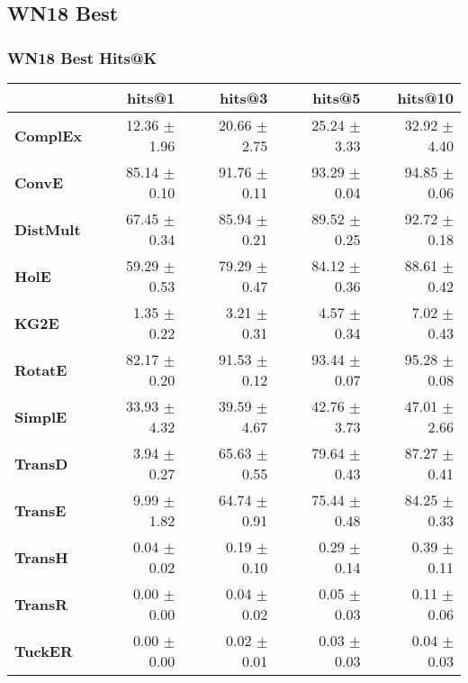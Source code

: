 \documentclass{article}
\begin{document}
\subsection{WN18 Best}
\subsubsection{WN18 Best Hits@K}
    \begin{center}
    \begin{tabular}{lrrrr}
\toprule
{} &        hits@1 &        hits@3 &        hits@5 &       hits@10 \\
\midrule
\textbf{ComplEx } &  12.36 $\pm$ 1.96 &  20.66 $\pm$ 2.75 &  25.24 $\pm$ 3.33 &  32.92 $\pm$ 4.40 \\
\textbf{ConvE   } &  85.14 $\pm$ 0.10 &  91.76 $\pm$ 0.11 &  93.29 $\pm$ 0.04 &  94.85 $\pm$ 0.06 \\
\textbf{DistMult} &  67.45 $\pm$ 0.34 &  85.94 $\pm$ 0.21 &  89.52 $\pm$ 0.25 &  92.72 $\pm$ 0.18 \\
\textbf{HolE    } &  59.29 $\pm$ 0.53 &  79.29 $\pm$ 0.47 &  84.12 $\pm$ 0.36 &  88.61 $\pm$ 0.42 \\
\textbf{KG2E    } &  $\phantom{5}$1.35 $\pm$ 0.22 &  $\phantom{5}$3.21 $\pm$ 0.31 &  $\phantom{5}$4.57 $\pm$ 0.34 &  $\phantom{5}$7.02 $\pm$ 0.43 \\
\textbf{RotatE  } &  82.17 $\pm$ 0.20 &  91.53 $\pm$ 0.12 &  93.44 $\pm$ 0.07 &  95.28 $\pm$ 0.08 \\
\textbf{SimplE  } &  33.93 $\pm$ 4.32 &  39.59 $\pm$ 4.67 &  42.76 $\pm$ 3.73 &  47.01 $\pm$ 2.66 \\
\textbf{TransD  } &  $\phantom{5}$3.94 $\pm$ 0.27 &  65.63 $\pm$ 0.55 &  79.64 $\pm$ 0.43 &  87.27 $\pm$ 0.41 \\
\textbf{TransE  } &  $\phantom{5}$9.99 $\pm$ 1.82 &  64.74 $\pm$ 0.91 &  75.44 $\pm$ 0.48 &  84.25 $\pm$ 0.33 \\
\textbf{TransH  } &  $\phantom{5}$0.04 $\pm$ 0.02 &  $\phantom{5}$0.19 $\pm$ 0.10 &  $\phantom{5}$0.29 $\pm$ 0.14 &  $\phantom{5}$0.39 $\pm$ 0.11 \\
\textbf{TransR  } &  $\phantom{5}$0.00 $\pm$ 0.00 &  $\phantom{5}$0.04 $\pm$ 0.02 &  $\phantom{5}$0.05 $\pm$ 0.03 &  $\phantom{5}$0.11 $\pm$ 0.06 \\
\textbf{TuckER  } &  $\phantom{5}$0.00 $\pm$ 0.00 &  $\phantom{5}$0.02 $\pm$ 0.01 &  $\phantom{5}$0.03 $\pm$ 0.03 &  $\phantom{5}$0.04 $\pm$ 0.03 \\
\bottomrule
\end{tabular}

    \end{center}
\end{document}
